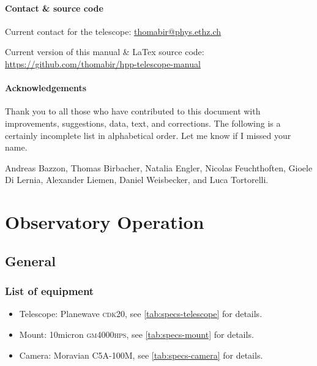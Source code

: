 \documentclass[a4paper, 11pt, fleqn]{memoir}
\begin{document}
\subsection*{Contact \& source code}

Current contact for the telescope: \url{thomabir@phys.ethz.ch}

\noindent Current version of this manual \& LaTex source code: \url{https://github.com/thomabir/hpp-telescope-manual}

\subsection*{Acknowledgements}

Thank you to all those who have contributed to this document with improvements, suggestions, data, text, and corrections.
The following is a certainly incomplete list in alphabetical order.
Let me know if I missed your name.

Andreas Bazzon,
Thomas Birbacher,
Natalia Engler,
Nicolas Feuchthoften,
Gioele Di Lernia,
Alexander Liemen,
Daniel Weisbecker, and
Luca Tortorelli.



\cleardoublepage

\tableofcontents

\mainmatter

\part{Observatory Operation}

\chapter{General}

\section{List of equipment}

\begin{itemize}
    \item Telescope: Planewave \textsc{cdk20}, see \cref{tab:specs-telescope} for details.
    \item Mount: 10micron \textsc{gm4000hps}, see \cref{tab:specs-mount} for details.
    \item Camera: Moravian C5A-100M, see \cref{tab:specs-camera} for details.
\end{itemize}
\end{document}

